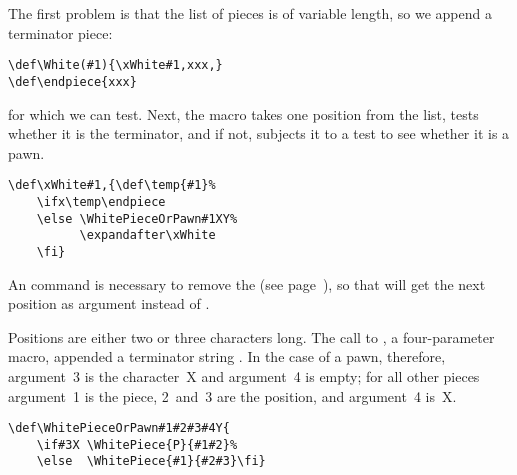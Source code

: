 \documentclass[letterpaper]{book}
\begin{document}
The first problem is that the list of pieces 
is of variable length, so we append a terminator piece:
\begin{verbatim}
\def\White(#1){\xWhite#1,xxx,}
\def\endpiece{xxx}
\end{verbatim}
for which we can test.
Next, the macro  takes one position from the list,
tests whether it is the terminator, and if not,
subjects it to a test to see whether it is a pawn.
\begin{verbatim}
\def\xWhite#1,{\def\temp{#1}%
    \ifx\temp\endpiece 
    \else \WhitePieceOrPawn#1XY%
          \expandafter\xWhite 
    \fi}
\end{verbatim}
An  command is necessary to remove the
 (see page~\pageref{after:cond}), so that 
 will get the next position as argument
instead of .

Positions  are either two or three characters long.
The call to , a four-parameter macro,
appended a terminator string . 
In the case of a pawn, therefore, argument~3 is the character~\n X
and argument~4 is empty; for all other pieces argument~1
is the piece, 2~and~3 are the position, and argument~4 is~\n X.
\begin{verbatim}
\def\WhitePieceOrPawn#1#2#3#4Y{
    \if#3X \WhitePiece{P}{#1#2}%
    \else  \WhitePiece{#1}{#2#3}\fi}
\end{verbatim}
\end{document}
